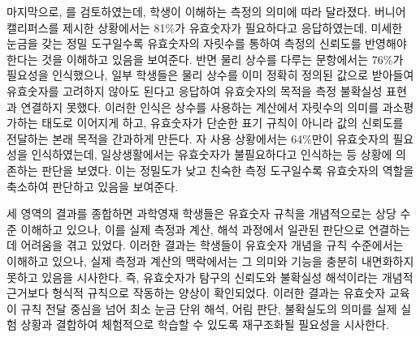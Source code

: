 마지막으로, 를 검토하였는데,
%
학생이 이해하는 측정의 의미에 따라 달라졌다.
%
버니어캘리퍼스를 제시한 상황에서는 81\%가 유효숫자가 필요하다고 응답하였는데,
미세한 눈금을 갖는 정밀 도구일수록 유효숫자의 자릿수를 통하여 측정의 신뢰도를 반영해야 한다는 것을
이해하고 있음을 보여준다.
%
반면 물리 상수를 다루는 문항에서는 76\%가 필요성을 인식했으나,
일부 학생들은 물리 상수를 이미 정확히 정의된 값으로 받아들여 유효숫자를 고려하지 않아도 된다고 응답하여
유효숫자의 목적을 측정 불확실성 표현과 연결하지 못했다.
이러한 인식은 상수를 사용하는 계산에서 자릿수의 의미를 과소평가하는 태도로 이어지게 하고,
유효숫자가 단순한 표기 규칙이 아니라 값의 신뢰도를 전달하는 본래 목적을 간과하게 만든다.
%
자 사용 상황에서는 64\%만이 유효숫자의 필요성을 인식하였는데,
일상생활에서는 유효숫자가 불필요하다고 인식하는 등 상황에 의존하는 판단을 보였다.
이는 정밀도가 낮고 친숙한 측정 도구일수록 유효숫자의 역할을 축소하여 판단하고 있음을 보여준다.

세 영역의 결과를 종합하면 과학영재 학생들은 유효숫자 규칙을 개념적으로는
상당 수준 이해하고 있으나, 이를 실제 측정과 계산, 해석 과정에서 일관된 판단으로
연결하는 데 어려움을 겪고 있었다.
%
이러한 결과는 학생들이 유효숫자 개념을 규칙 수준에서는 이해하고 있으나,
실제 측정과 계산의 맥락에서는 그 의미와 기능을 충분히 내면화하지 못하고 있음을 시사한다.
%
즉, 유효숫자가 탐구의 신뢰도와 불확실성 해석이라는 개념적 근거보다 형식적 규칙으로
작동하는 양상이 확인되었다.
%
이러한 결과는 유효숫자 교육이 규칙 전달 중심을 넘어 최소 눈금 단위 해석,
어림 판단, 불확실도의 의미를 실제 실험 상황과 결합하여 체험적으로 학습할 수 있도록
재구조화될 필요성을 시사한다.